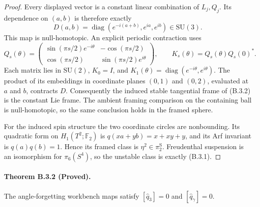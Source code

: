 \begin{proof}
Every displayed vector is a constant linear combination
of $L_j,Q_j$.  Its dependence on $(a,b)$ is therefore
exactly
\[
 D(a,b)=\operatorname{diag}(e^{-i(a+b)},e^{ia},e^{ib})
            \in\mathrm{SU}(3).
\]
This map is null-homotopic.  An explicit periodic
contraction uses
\[
 Q_s(\theta)=
 \begin{pmatrix}
 \sin(\pi s/2)e^{-i\theta}&-\cos(\pi s/2)\\
 \cos(\pi s/2)&\sin(\pi s/2)e^{i\theta}
 \end{pmatrix},
 \qquad K_s(\theta)=Q_s(\theta)Q_s(0)^*.
\]
Each matrix lies in $\mathrm{SU}(2)$,
$K_0=I$, and $K_1(\theta)=\operatorname{diag}
(e^{-i\theta},e^{i\theta})$.  The product of its
embeddings in coordinate planes $(0,1)$ and $(0,2)$,
evaluated at $a$ and $b$, contracts $D$.
Consequently the induced stable tangential frame of
(B.3.2) is the constant Lie frame.  The ambient framing
comparison on the containing ball is null-homotopic,
so the same conclusion holds in the framed sphere.

For the induced spin structure the two coordinate
circles are nonbounding.  Its quadratic form on
$H_1(T^2;\mathbb F_2)$ is
$q(xa+yb)=x+xy+y$, and its Arf invariant is
$q(a)q(b)=1$.  Hence its framed class is
$\eta^2\in\pi_2^{\mathrm S}$.  Freudenthal suspension
is an isomorphism for $\pi_6(S^4)$, so the unstable
class is exactly (B.3.1).
\end{proof}

\paragraph{Theorem B.3.2 (Proved).}
The angle-forgetting workbench maps satisfy
$[\widehat q_3]=0$ and $[\widehat q_\gamma]=0$.

